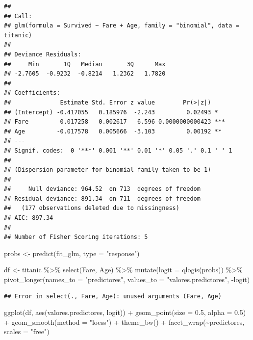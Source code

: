 \documentclass[
  12pt,
]{book}
\newenvironment{Shaded}{\begin{snugshade}}{\end{snugshade}}
\newcommand{\AttributeTok}[1]{\textcolor[rgb]{0.77,0.63,0.00}{#1}}
\newcommand{\FloatTok}[1]{\textcolor[rgb]{0.00,0.00,0.81}{#1}}
\newcommand{\FunctionTok}[1]{\textcolor[rgb]{0.00,0.00,0.00}{#1}}
\newcommand{\NormalTok}[1]{#1}
\newcommand{\OtherTok}[1]{\textcolor[rgb]{0.56,0.35,0.01}{#1}}
\newcommand{\SpecialCharTok}[1]{\textcolor[rgb]{0.00,0.00,0.00}{#1}}
\newcommand{\StringTok}[1]{\textcolor[rgb]{0.31,0.60,0.02}{#1}}
\begin{document}
\begin{verbatim}
## 
## Call:
## glm(formula = Survived ~ Fare + Age, family = "binomial", data = titanic)
## 
## Deviance Residuals: 
##     Min       1Q   Median       3Q      Max  
## -2.7605  -0.9232  -0.8214   1.2362   1.7820  
## 
## Coefficients:
##              Estimate Std. Error z value        Pr(>|z|)    
## (Intercept) -0.417055   0.185976  -2.243         0.02493 *  
## Fare         0.017258   0.002617   6.596 0.0000000000423 ***
## Age         -0.017578   0.005666  -3.103         0.00192 ** 
## ---
## Signif. codes:  0 '***' 0.001 '**' 0.01 '*' 0.05 '.' 0.1 ' ' 1
## 
## (Dispersion parameter for binomial family taken to be 1)
## 
##     Null deviance: 964.52  on 713  degrees of freedom
## Residual deviance: 891.34  on 711  degrees of freedom
##   (177 observations deleted due to missingness)
## AIC: 897.34
## 
## Number of Fisher Scoring iterations: 5
\end{verbatim}

\begin{Shaded}
\begin{Highlighting}[]
\NormalTok{probs }\OtherTok{\textless{}{-}} \FunctionTok{predict}\NormalTok{(fit\_glm, }\AttributeTok{type =} \StringTok{"response"}\NormalTok{)}

\NormalTok{df }\OtherTok{\textless{}{-}}\NormalTok{ titanic }\SpecialCharTok{\%\textgreater{}\%}
    \FunctionTok{select}\NormalTok{(Fare, Age) }\SpecialCharTok{\%\textgreater{}\%}
    \FunctionTok{mutate}\NormalTok{(}\AttributeTok{logit =} \FunctionTok{qlogis}\NormalTok{(probs)) }\SpecialCharTok{\%\textgreater{}\%}
    \FunctionTok{pivot\_longer}\NormalTok{(}\AttributeTok{names\_to =} \StringTok{"predictores"}\NormalTok{, }\AttributeTok{values\_to =} \StringTok{"valores.predictores"}\NormalTok{,}
        \SpecialCharTok{{-}}\NormalTok{logit)}
\end{Highlighting}
\end{Shaded}

\begin{verbatim}
## Error in select(., Fare, Age): unused arguments (Fare, Age)
\end{verbatim}

\begin{Shaded}
\begin{Highlighting}[]
\FunctionTok{ggplot}\NormalTok{(df, }\FunctionTok{aes}\NormalTok{(valores.predictores, logit)) }\SpecialCharTok{+} \FunctionTok{geom\_point}\NormalTok{(}\AttributeTok{size =} \FloatTok{0.5}\NormalTok{,}
    \AttributeTok{alpha =} \FloatTok{0.5}\NormalTok{) }\SpecialCharTok{+} \FunctionTok{geom\_smooth}\NormalTok{(}\AttributeTok{method =} \StringTok{"loess"}\NormalTok{) }\SpecialCharTok{+}
    \FunctionTok{theme\_bw}\NormalTok{() }\SpecialCharTok{+} \FunctionTok{facet\_wrap}\NormalTok{(}\SpecialCharTok{\textasciitilde{}}\NormalTok{predictores, }\AttributeTok{scales =} \StringTok{"free"}\NormalTok{)}
\end{Highlighting}
\end{Shaded}
\end{document}
